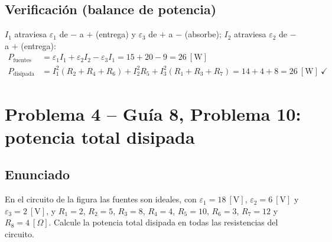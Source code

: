 \documentclass[12pt,letterpaper]{article}
\begin{document}
\subsection*{Verificaci\'on (balance de potencia)}

$I_1$ atraviesa $\varepsilon_1$ de $-$ a $+$ (entrega) y $\varepsilon_3$ de $+$ a $-$ (absorbe);
$I_2$ atraviesa $\varepsilon_2$ de $-$ a $+$ (entrega):
\begin{align*}
    P_{\text{fuentes}} &= \varepsilon_1 I_1 + \varepsilon_2 I_2 - \varepsilon_3 I_1 = 15 + 20 - 9 = 26\ [\text{W}]\\[2pt]
    P_{\text{disipada}} &= I_1^2(R_2+R_4+R_6) + I_2^2R_5 + I_3^2(R_1+R_3+R_7) = 14 + 4 + 8 = 26\ [\text{W}]\ \checkmark
\end{align*}

\newpage

\section*{Problema 4 -- Gu\'ia 8, Problema 10: potencia total disipada}

\subsection*{Enunciado}

En el circuito de la figura las fuentes son ideales, con $\varepsilon_1 = 18\ [\text{V}]$,
$\varepsilon_2 = 6\ [\text{V}]$ y $\varepsilon_3 = 2\ [\text{V}]$, y
$R_1 = 2$, $R_2 = 5$, $R_3 = 8$, $R_4 = 4$, $R_5 = 10$, $R_6 = 3$, $R_7 = 12$ y $R_8 = 4\ [\Omega]$.
Calcule la potencia total disipada en todas las resistencias del circuito.
\end{document}
